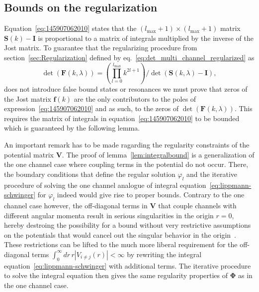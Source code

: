 \documentclass[mathpazo]{cicp}
\begin{document}
\subsection{Bounds on the regularization}
\label{appsec:boundsproof}
Equation~\eqref{eq:145907062010} states that the $(l_{\text{max}}+1) \times (l_{\text{max}}+1)$ matrix $\mathbold{S}(k)-\mathbold{I}$ is proportional to a matrix of integrals multiplied by the inverse of the Jost matrix. To guarantee that the regularizing procedure from section~\ref{sec:Regularization} defined by eq.~\eqref{eq:det_multi_channel_regularized} as
\begin{equation}
	\label{appeq:det_multi_channel_regularized}
	\det(\mathbold{F}(k,\lambda)) = \left( \prod_{l=0}^{l_{\text{max}}} k^{2l+1} \right) \bigg/ \det(\mathbold{S}(k,\lambda)-\mathbold{I}),
\end{equation}
does not introduce false bound states or resonances we must prove that zeros of the Jost matrix $\mathbold{f}(k)$ are the only contributors to the poles of expression~\eqref{eq:145907062010} and as such, to the zeros of $\det(\mathbold{F}(k,\lambda))$. This requires the matrix of integrals in equation~\eqref{eq:145907062010} to be bounded which is guaranteed by the following lemma.

An important remark has to be made ragarding the regularity constraints of the potential matrix $\mathbold{V}$. The proof of lemma~\ref{lem:integralbound} is a generalization of the one channel case where coupling terms in the potential do not occur. There, the boundary conditions that define the regular solution $\varphi_{l}$ and the iterative procedure of solving the one channel analogue of integral equation~\eqref{eq:lippmann-schwinger} for $\varphi_{l}$ indeed would give rise to proper bounds. Contrary to the one channel case however, the off-diagonal terms in $\mathbold{V}$ that couple channels with different angular momenta result in serious singularities in the origin $r=0$, hereby destroing the possibility for a bound without very restrictive assumptions on the potentials that would cancel out the singular behavior in the origin~\cite{Newton1982,Newton1960}. These restrictions can be lifted to the much more liberal requirement for the off-diagonal terms $\int_{0}^{\infty}dr\,r|V_{i\neq j}(r)| < \infty$ by rewriting the integral equation~\eqref{eq:lippmann-schwinger} with additional terms. The iterative procedure to solve the integral equation then gives the same regularity properties of $\mathbold{\Phi}$ as in the one channel case.
\end{document}
